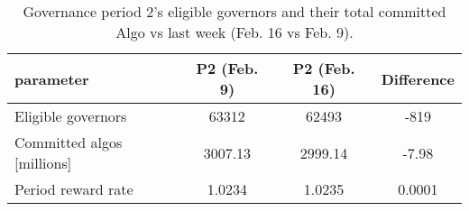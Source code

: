 %
\begin{longtable}[c]{ l c c c }
\caption{Governance period 2's eligible governors and their total committed Algo vs last week (Feb. 16 vs Feb. 9).} \\
\hline
\textbf{parameter} & \textbf{P2 (Feb. 9)} & \textbf{P2 (Feb. 16)} & \textbf{Difference} \\
\hline

Eligible governors & 63312 & 62493 & -819 \\
Committed algos [millions] & 3007.13 & 2999.14 & -7.98 \\
Period reward rate & 1.0234 & 1.0235 & 0.0001 \\
\hline
\end{longtable} 
